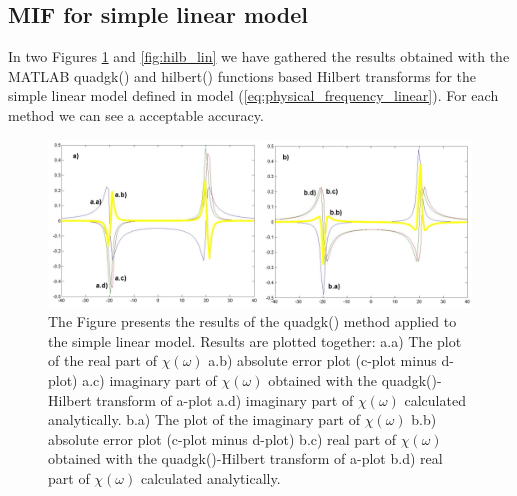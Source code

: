 \documentclass[12pt,twoside,a4paper]{article}
\numberwithin{equation}{subsection}
\numberwithin{figure}{subsection}
\begin{document}
\subsection{MIF for simple linear model} \label{chap:matlab_lin}

In two Figures \ref{fig:quadgk_lin} and \ref{fig:hilb_lin} we have ga\-thered the results ob\-tained with the MATLAB quadgk() and
hilbert() functions based Hil\-bert trans\-forms for the simple linear model defined in model (\ref{eq:physical_frequency_linear}).
For each method we can see a accep\-table accu\-racy.

\begin{figure} 
  \includegraphics[width=150mm]{img/quadgk_lin.png}
  \caption{The Figure presents the results of the quadgk() method applied to the simple linear model. Results are plotted together:
   a.a) The plot of the real part of $\chi (\omega )$ 
   a.b) absolute error plot (c-plot minus d-plot) 
   a.c) imaginary part of $\chi (\omega )$ obtained with the quadgk()-Hilbert transform of a-plot 
   a.d) imaginary part of $\chi (\omega )$  calculated analytically. 
   b.a) The plot of the imaginary part of $\chi (\omega )$ 
   b.b) absolute error plot (c-plot minus d-plot) 
   b.c) real part of $\chi (\omega )$ obtained with the quadgk()-Hilbert transform of a-plot 
   b.d) real part of $\chi (\omega )$ calculated analytically. \label{fig:quadgk_lin}
  }
\end{figure}
\end{document}
